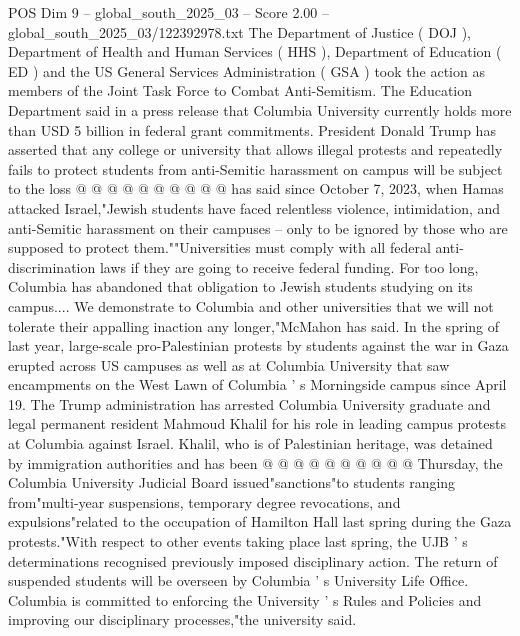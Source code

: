 \begin{textsample}{POS Dim 9 – global\_south\_2025\_03 – Score 2.00 – global\_south\_2025\_03/122392978.txt}
The Department of Justice ( DOJ ), Department of Health and Human Services ( HHS ), Department of Education ( ED ) and the US General Services Administration ( GSA ) took the action as members of the Joint Task Force to Combat Anti-Semitism.
The Education Department said in a press release that Columbia University currently holds more than USD 5 billion in federal grant commitments.
President Donald Trump has asserted that any college or university that allows illegal protests and repeatedly fails to protect students from anti-Semitic harassment on campus will be subject to the loss @ @ @ @ @ @ @ @ @ @ has said since October 7, 2023, when Hamas attacked Israel,"Jewish students have faced relentless violence, intimidation, and anti-Semitic harassment on their campuses -- only to be ignored by those who are supposed to protect them.""Universities must comply with all federal anti-discrimination laws if they are going to receive federal funding.
For too long, Columbia has abandoned that obligation to Jewish students studying on its campus....
We demonstrate to Columbia and other universities that we will not tolerate their appalling inaction any longer,"McMahon has said.
In the spring of last year, large-scale pro-Palestinian protests by students against the war in Gaza erupted across US campuses as well as at Columbia University that saw encampments on the West Lawn of Columbia ' s Morningside campus since April 19.
The Trump administration has arrested Columbia University graduate and legal permanent resident Mahmoud Khalil for his role in leading campus protests at Columbia against Israel.
Khalil, who is of Palestinian heritage, was detained by immigration authorities and has been @ @ @ @ @ @ @ @ @ @ Thursday, the Columbia University Judicial Board issued"sanctions"to students ranging from"multi-year suspensions, temporary degree revocations, and expulsions"related to the occupation of Hamilton Hall last spring during the Gaza protests."With respect to other events taking place last spring, the UJB ' s determinations recognised previously imposed disciplinary action.
The return of suspended students will be overseen by Columbia ' s University Life Office.
Columbia is committed to enforcing the University ' s Rules and Policies and improving our disciplinary processes,"the university said.

\end{textsample}
